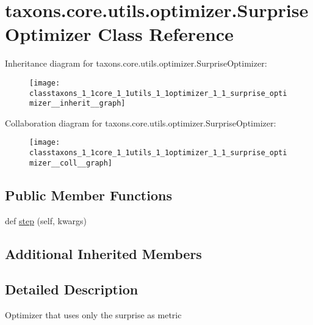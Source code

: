 \hypertarget{classtaxons_1_1core_1_1utils_1_1optimizer_1_1_surprise_optimizer}{}\section{taxons.\+core.\+utils.\+optimizer.\+Surprise\+Optimizer Class Reference}
\label{classtaxons_1_1core_1_1utils_1_1optimizer_1_1_surprise_optimizer}


Inheritance diagram for taxons.\+core.\+utils.\+optimizer.\+Surprise\+Optimizer\+:
\nopagebreak
\begin{figure}[H]
\begin{center}
\leavevmode
\texttt{[image: classtaxons\_1\_1core\_1\_1utils\_1\_1optimizer\_1\_1\_surprise\_optimizer\_\_inherit\_\_graph]}
\end{center}
\end{figure}


Collaboration diagram for taxons.\+core.\+utils.\+optimizer.\+Surprise\+Optimizer\+:
\nopagebreak
\begin{figure}[H]
\begin{center}
\leavevmode
\texttt{[image: classtaxons\_1\_1core\_1\_1utils\_1\_1optimizer\_1\_1\_surprise\_optimizer\_\_coll\_\_graph]}
\end{center}
\end{figure}
\subsection*{Public Member Functions}
\begin{DoxyCompactItemize}
\item 
def \hyperlink{classtaxons_1_1core_1_1utils_1_1optimizer_1_1_surprise_optimizer_a1753c2e33898d3a16656100044f34272}{step} (self, kwargs)
\end{DoxyCompactItemize}
\subsection*{Additional Inherited Members}


\subsection{Detailed Description}
\begin{DoxyVerb}Optimizer that uses only the surprise as metric
\end{DoxyVerb}
 

